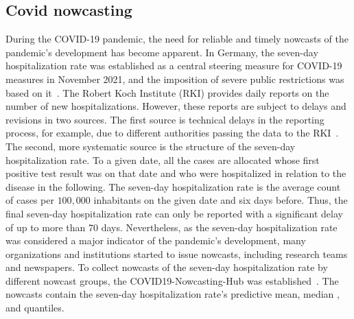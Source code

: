

\subsection{Covid nowcasting} \label{sec:application-covid}

During the COVID-19 pandemic, the need for reliable and timely nowcasts of the pandemic's development has become apparent.
In Germany, the seven-day hospitalization rate was established as a central steering measure for COVID-19 measures in November 2021, and the imposition of severe public restrictions was based on it~\parencite{RobertKochInstitute2021}.
The Robert Koch Institute (RKI) provides daily reports on the number of new hospitalizations.
However, these reports are subject to delays and revisions in two sources.
The first source is technical delays in the reporting process, for example, due to different authorities passing the data to the RKI~\parencite{RobertKochInstitute2024}.
The second, more systematic source is the structure of the seven-day hospitalization rate.
To a given date, all the cases are allocated whose first positive test result was on that date and who were hospitalized in relation to the disease in the following.
The seven-day hospitalization rate is the average count of cases per $100,000$ inhabitants on the given date and six days before.
Thus, the final seven-day hospitalization rate can only be reported with a significant delay of up to more than 70 days.
Nevertheless, as the seven-day hospitalization rate was considered a major indicator of the pandemic's development, many organizations and institutions started to issue nowcasts, including research teams and newspapers.
To collect nowcasts of the seven-day hospitalization rate by different nowcast groups, the COVID19-Nowcasting-Hub was established~\parencite{ChairOfEconometricsAndStatisticsAtKarlsruheInstituteOfTechnology2024}.
The nowcasts contain the seven-day hospitalization rate's predictive mean, median , and quantiles.
